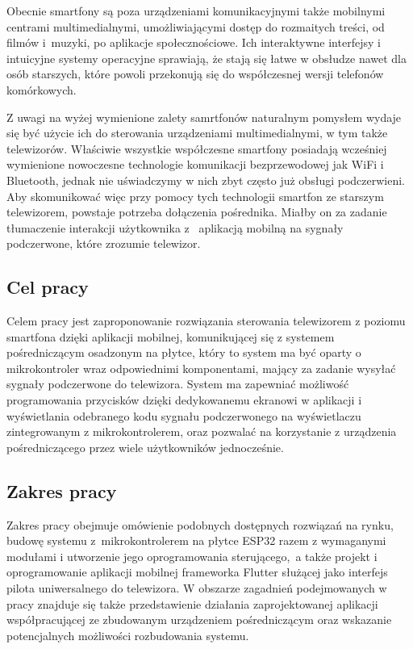 \documentclass[12pt,twoside]{article}
\begin{document}
Obecnie smartfony są poza urządzeniami komunikacyjnymi także mobilnymi centrami multimedialnymi,
umożliwiającymi dostęp do rozmaitych treści, od filmów i~muzyki, po aplikacje społecznościowe.
Ich interaktywne interfejsy i intuicyjne systemy operacyjne sprawiają, że stają się łatwe w obsłudze nawet dla osób starszych,
które powoli przekonują się do współczesnej wersji telefonów komórkowych.

Z uwagi na wyżej wymienione zalety samrtfonów naturalnym pomysłem wydaje się być użycie ich do
sterowania urządzeniami multimedialnymi, w tym także telewizorów. Właściwie wszystkie współczesne smartfony posiadają
wcześniej wymienione nowoczesne technologie komunikacji bezprzewodowej jak WiFi i Bluetooth, jednak nie uświadczymy w nich zbyt często już obsługi podczerwieni. Aby skomunikować więc przy pomocy tych technologii smartfon
ze starszym telewizorem, powstaje potrzeba dołączenia pośrednika. Miałby on za zadanie tłumaczenie interakcji
użytkownika z~ aplikacją mobilną na sygnały podczerwone, które zrozumie telewizor.

\subsection{Cel pracy}
Celem pracy jest zaproponowanie rozwiązania sterowania telewizorem z poziomu
smartfona dzięki aplikacji mobilnej, komunikującej się z systemem pośredniczącym osadzonym na  płytce, który to system ma być oparty o mikrokontroler wraz odpowiednimi komponentami, mający za zadanie wysyłać sygnały podczerwone do telewizora. System ma zapewniać możliwość programowania przycisków dzięki dedykowanemu ekranowi w aplikacji i
wyświetlania odebranego kodu sygnału podczerwonego na wyświetlaczu zintegrowanym z mikrokontrolerem, oraz pozwalać na korzystanie z urządzenia pośredniczącego przez wiele użytkowników jednocześnie.

\subsection{Zakres pracy}
Zakres pracy obejmuje omówienie podobnych dostępnych rozwiązań na rynku, budowę systemu z~mikrokontrolerem na płytce ESP32 razem z wymaganymi modułami i utworzenie jego oprogramowania sterującego,~a także projekt i oprogramowanie aplikacji
mobilnej frameworka Flutter służącej jako interfejs pilota uniwersalnego do telewizora. W obszarze zagadnień podejmowanych w pracy znajduje się także przedstawienie działania zaprojektowanej aplikacji współpracującej ze zbudowanym urządzeniem pośredniczącym oraz wskazanie potencjalnych możliwości rozbudowania systemu.
\end{document}
